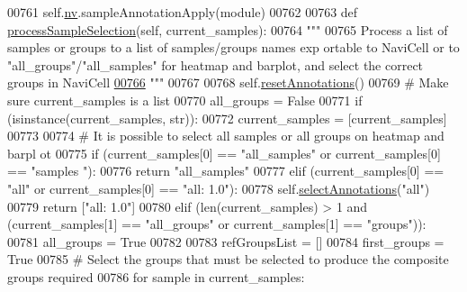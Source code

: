 \begin{DoxyCode}
00761         self.\hyperlink{classnavicom_1_1navicom_1_1NaviCom_af740fe52f9f3cfc076ae88ca696bd05e}{nv}.sampleAnnotationApply(module)
00762 
00763     \textcolor{keyword}{def }\hyperlink{classnavicom_1_1navicom_1_1NaviCom_a6536cf86235df90cb7443c23f11870e4}{processSampleSelection}(self, current\_samples):
00764         \textcolor{stringliteral}{"""}
00765 \textcolor{stringliteral}{        Process a list of samples or groups to a list of samples/groups names exp
      ortable to NaviCell or to "all\_groups"/"all\_samples" for heatmap and barplot, and
       select the correct groups in NaviCell}
\hypertarget{navicom_8py_source_l00766}{}\hyperlink{classnavicom_1_1navicom_1_1NaviCom_a6536cf86235df90cb7443c23f11870e4}{00766} \textcolor{stringliteral}{        """}
00767 
00768         self.\hyperlink{classnavicom_1_1navicom_1_1NaviCom_ab92b6e95417e01126d9d73903acc2a3b}{resetAnnotations}()
00769         \textcolor{comment}{# Make sure current\_samples is a list}
00770         all\_groups = \textcolor{keyword}{False}
00771         \textcolor{keywordflow}{if} (isinstance(current\_samples, str)):
00772             current\_samples = [current\_samples]
00773 
00774         \textcolor{comment}{# It is possible to select all samples or all groups on heatmap and barpl
      ot}
00775         \textcolor{keywordflow}{if} (current\_samples[0] == \textcolor{stringliteral}{"all\_samples"} \textcolor{keywordflow}{or} current\_samples[0] == \textcolor{stringliteral}{"samples
      "}):
00776             \textcolor{keywordflow}{return} \textcolor{stringliteral}{"all\_samples"}
00777         \textcolor{keywordflow}{elif} (current\_samples[0] == \textcolor{stringliteral}{"all"} \textcolor{keywordflow}{or} current\_samples[0] == \textcolor{stringliteral}{"all: 1.0"}):
00778             self.\hyperlink{classnavicom_1_1navicom_1_1NaviCom_ad298207a958acd2cee82c7df7eace0d3}{selectAnnotations}(\textcolor{stringliteral}{"all"})
00779             \textcolor{keywordflow}{return} [\textcolor{stringliteral}{"all: 1.0"}]
00780         \textcolor{keywordflow}{elif} (len(current\_samples) > 1 \textcolor{keywordflow}{and} (current\_samples[1] == \textcolor{stringliteral}{"all\_groups"} \textcolor{keywordflow}{or
      } current\_samples[1] == \textcolor{stringliteral}{"groups"})):
00781             all\_groups = \textcolor{keyword}{True}
00782 
00783         refGroupsList = []
00784         first\_groups = \textcolor{keyword}{True}
00785         \textcolor{comment}{# Select the groups that must be selected to produce the composite groups
       required}
00786         \textcolor{keywordflow}{for} sample \textcolor{keywordflow}{in} current\_samples:

\end{DoxyCode}
